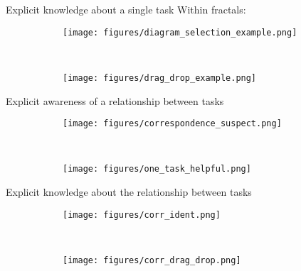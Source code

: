 \documentclass{beamer}
\begin{document}

\begin{frame}{Explicit knowledge about a single task}
Within fractals:
\begin{figure}
\centering
\begin{subfigure}{0.45\textwidth}
\texttt{[image: figures/diagram\_selection\_example.png]}
\end{subfigure}~
\begin{subfigure}{0.45\textwidth}
\texttt{[image: figures/drag\_drop\_example.png]}
\end{subfigure}
\end{figure}
\end{frame}

\begin{frame}{Explicit awareness of a relationship between tasks}
\begin{figure}
\centering
\begin{subfigure}{0.9\textwidth}
\texttt{[image: figures/correspondence\_suspect.png]}
\end{subfigure}\\
\begin{subfigure}{0.9\textwidth}
\texttt{[image: figures/one\_task\_helpful.png]}
\end{subfigure}
\end{figure}
\end{frame}

\begin{frame}{Explicit knowledge about the relationship between tasks}
\begin{figure}
\centering
\begin{subfigure}{0.45\textwidth}
\texttt{[image: figures/corr\_ident.png]}
\end{subfigure}~
\begin{subfigure}{0.45\textwidth}
\texttt{[image: figures/corr\_drag\_drop.png]}
\end{subfigure}
\end{figure}
\end{frame}
\end{document}
